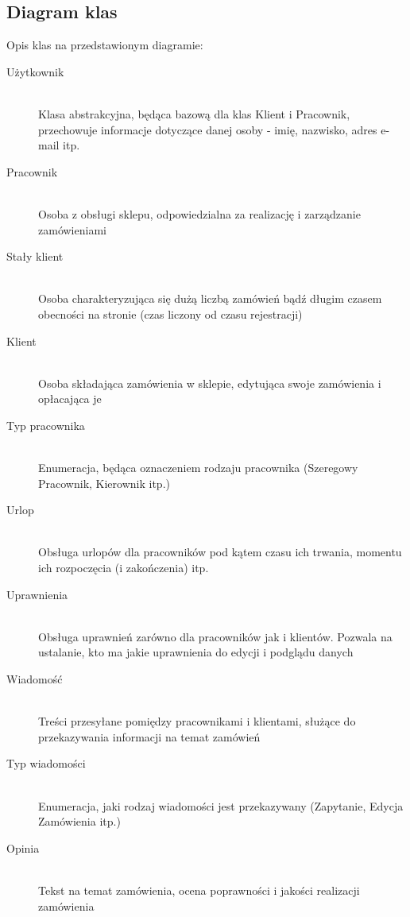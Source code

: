 \subsection{Diagram klas}




\newpage
Opis klas na przedstawionym diagramie:

\begin{description}
	\item[Użytkownik] \hfill \\
		Klasa abstrakcyjna, będąca bazową dla klas Klient i Pracownik, przechowuje
		informacje dotyczące danej osoby - imię, nazwisko, adres e-mail itp.
	\item[Pracownik] \hfill \\
	 	Osoba z obsługi sklepu, odpowiedzialna za realizację i zarządzanie
	 	zamówieniami
	\item[Stały klient] \hfill \\
		Osoba charakteryzująca się dużą liczbą zamówień bądź długim czasem obecności
		na stronie (czas liczony od czasu rejestracji)
	\item[Klient] \hfill \\
		Osoba składająca zamówienia w sklepie, edytująca swoje zamówienia i opłacająca
		je
	\item[Typ pracownika] \hfill \\
		Enumeracja, będąca oznaczeniem rodzaju pracownika (Szeregowy Pracownik,
		Kierownik itp.)
	\item[Urlop] \hfill \\
		Obsługa urlopów dla pracowników pod kątem czasu ich trwania, momentu ich
		rozpoczęcia (i zakończenia) itp.
	\item[Uprawnienia] \hfill \\
		Obsługa uprawnień zarówno dla pracowników jak i klientów. Pozwala na
		ustalanie, kto ma jakie uprawnienia do edycji i podglądu danych
	\item[Wiadomość] \hfill \\
		Treści przesyłane pomiędzy pracownikami i klientami, służące do przekazywania
		informacji na temat zamówień
	\item[Typ wiadomości] \hfill \\
		Enumeracja, jaki rodzaj wiadomości jest przekazywany (Zapytanie, Edycja
		Zamówienia itp.)
	\item[Opinia] \hfill \\
		Tekst na temat zamówienia, ocena poprawności i jakości realizacji zamówienia

\end{description}
